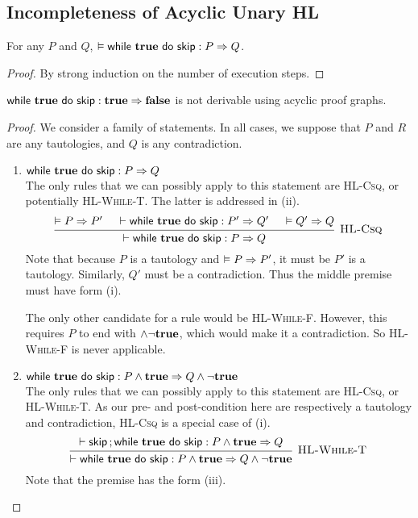 \subsection{Incompleteness of Acyclic Unary HL}

\begin{lemma}
    For any $P$ and $Q$,
    $\VAL \Triple {\While {\True} do {\Skip} } : P => Q$.
\end{lemma}
\begin{proof}
    By strong induction on the number of execution steps.
\end{proof}

\begin{lemma}
    $\Triple {\While {\True} do {\Skip} } : \True => \False$ is not derivable using acyclic proof graphs.
\end{lemma}
\begin{proof}
We consider a family of statements. 
In all cases, we suppose that $P$ and $R$ are any tautologies, and $Q$ is any contradiction.
\begin{enumerate}[label=(\roman*)]
\item $\Triple {\While {\True} do {\Skip} } : P => Q$ \\
    The only rules that we can possibly apply to this statement are \textsc{HL-Csq},
    or potentially \textsc{HL-While-T}. The latter is addressed in (ii).
    \[\begin{prooftree}
        \hypo{\VAL P \Rightarrow P'}
        \hypo{\DER \Triple {\While {\True} do {\Skip} } : P' => Q'}
        \hypo{\VAL Q' \Rightarrow Q}
        \infer3[\textsc{HL-Csq}] 
            {\DER \Triple {\While {\True} do {\Skip} } : P => Q}
    \end{prooftree}\]
%
    Note that because $P$ is a tautology and $\vDash P \Rightarrow P'$,
    it must be $P'$ is a tautology.
    Similarly, $Q'$ must be a contradiction.
    Thus the middle premise must have form (i).

    The only other candidate for a rule would be \textsc{HL-While-F}.
    However, this requires $P$ to end with $\wedge \neg \textbf{true}$,
    which would make it a contradiction.
    So \textsc{HL-While-F} is never applicable.

\item $\Triple {\While {\True} do {\Skip} } : P \wedge \True => Q \wedge \neg \True$ \\
    The only rules that we can possibly apply to this statement are \textsc{HL-Csq},
    or \textsc{HL-While-T}. As our pre- and post-condition here are respectively a tautology and contradiction, \textsc{HL-Csq} is a special case of (i).
    \[\begin{prooftree}
        \hypo{\DER \Triple {\Seq {\Skip} ; {\While {\True} do {\Skip}} } : P \wedge \True => Q}
        \infer1[\textsc{HL-While-T}] 
            {\DER \Triple {\While {\True} do {\Skip} } : P \wedge \True => Q \wedge \neg \True}
    \end{prooftree}\]
%
    Note that the premise has the form (iii).
    

\end{enumerate}
\end{proof}
